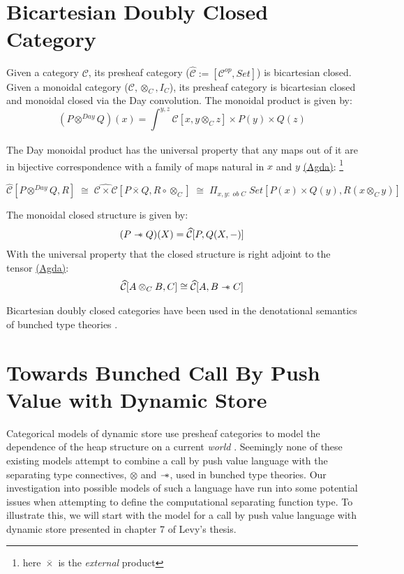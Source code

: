\documentclass{article}
\newcommand{\sep}{\mathrel{-\mkern-6mu*}}
\newcommand{\pshC}{\widehat{\mathcal{C}}}
\newcommand{\pshCC}{\widehat{\mathcal{C \times C}}}
\newcommand{\dayprod}{\otimes^{Day}}
\begin{document}
\section{Bicartesian Doubly Closed Category}
Given a category $\mathcal{C}$, its presheaf category ($\pshC := [\mathcal{C}^{op}, Set]$)
is bicartesian closed. Given a monoidal category ($\mathcal{C}, \otimes_C , I_C$), 
its presheaf category is bicartesian closed and monoidal closed via the Day convolution. 
The monoidal product is given by:
\[
    (P \dayprod Q)(x) = \int_{}^{y,z} \mathcal{C}[ x , y \otimes_C z ] 
    \times P(y) \times Q(z)
\]

The Day monoidal product has the universal property that any maps out of it are in bijective
correspondence with a family of maps natural in $x$ and $y$ 
\href{https://github.com/bond15/Bunched-CBPV/blob/82136dc6f4f9e4034391877f0d959a6ff1b62dfc/src/Data/BiDCC.agda#L222}
{(Agda)}: 
\footnote{here $\overline{\times}$ is the \textit{external} product}


\[
    \pshC[P \dayprod Q , R] \;\cong \; \pshCC [ P \overline{\times} Q , R \circ \otimes_C ]\; \cong \; \Pi_{x, y : \;ob \;C}\; Set[P(x) \times Q(y) , R(x \otimes_C y)]
\]

The monoidal closed structure is given by: 
\begin{align*}
    (P \sep Q)(X) = \pshC[P , Q(X , -)]
\end{align*}
With the universal property that the closed structure is right adjoint to the tensor
\href{https://github.com/bond15/Bunched-CBPV/blob/82136dc6f4f9e4034391877f0d959a6ff1b62dfc/src/Data/BiDCC.agda#L354}{(Agda)}: 
\begin{align}
    \pshC [ A \otimes_C B , C] \cong \pshC [ A , B \sep C]
\end{align}

Bicartesian doubly closed categories have been used in the denotational semantics of bunched type theories 
\cite{pym_semantics_2002}\cite{bieringLogicBunchedImplications}\cite{ohearn_bunched_2003}.

\section{Towards Bunched Call By Push Value with Dynamic Store}
Categorical models of dynamic store use presheaf categories to model the dependence of the heap structure on a current \textit{world}
\cite{CBPVbook}\cite{sterling_denotational_2023}\cite{kammarMonadFullGround2017}. Seemingly none of these existing models 
attempt to combine a call by push value language with the separating type connectives, $\otimes$ and $\sep$, used in bunched type theories.
Our investigation into possible models of such a language have run into some potential issues when attempting to define the computational separating function type.
To illustrate this, we will start with the 
model for a call by push value language with dynamic store presented in chapter 7 of Levy's thesis.
\end{document}
